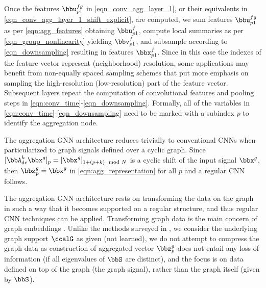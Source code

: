 Once the features $\bbu_{p1}^{fg}$ in \eqref{eqn_conv_agg_layer_1}, or their equivalents in \eqref{eqn_conv_agg_layer_1_shift_explicit}, are computed, we sum features $\bbu_{p1}^{fg}$ as per \eqref{eqn:agg_features} obtaining $\bbu_{p1}^{f}$, compute local summaries as per \eqref{eqn_group_nonlinearity} yielding $\bbv_{p1}^{f}$, and subsample according to \eqref{eqn_downsampling} resulting in features $\bbx_{p1}^{f}$. Since in this case the indexes of the feature vector represent (neighborhood) resolution, some applications may benefit from non-equally spaced sampling schemes that put more emphasis on sampling the high-resolution (low-resolution) part of the feature vector. Subsequent layers repeat the computation of convolutional features and pooling steps in \eqref{eqn:conv_time}-\eqref{eqn_downsampling}. Formally, all of the variables in \eqref{eqn:conv_time}-\eqref{eqn_downsampling} need to be marked with a subindex $p$ to identify the aggregation node.

\begin{remark} \normalfont
The aggregation GNN architecture reduces trivially to conventional CNNs when particularized to graph signals defined over a cyclic graph. Since $[\bbA_{\dc}^{k} \bbx^{g}]_{p} = [\bbx^{g}]_{1+(p+k) \mod N}$ is a cyclic shift of the input signal $\bbx^{g}$, then $\bbz_{p}^{g}=\bbx^{g}$ in \eqref{eqn:agg_representation} for all $p$ and a regular CNN follows.
\end{remark}

\begin{remark} \normalfont
The aggregation GNN architecture rests on transforming the data on the graph in such a way that it becomes supported on a regular structure, and thus regular CNN techniques can be applied. Transforming graph data is the main concern of graph embeddings \cite{cai17-embeddings}. Unlike the methods surveyed in \cite{cai17-embeddings}, we consider the underlying graph support $\ccalG$ as given (not learned), we do not attempt to compress the graph data as construction of aggregated vector $\bbz_{p}^{g}$ does not entail any loss of information (if all eigenvalues of $\bbS$ are distinct), and the focus is on data defined on top of the graph (the graph signal), rather than the graph itself (given by $\bbS$).
\end{remark}

%
